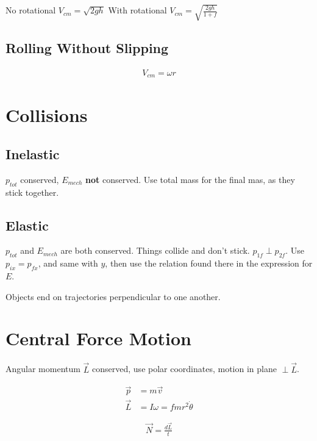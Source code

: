 \documentclass[10pt]{amsart}
\newcommand{\vc}[1]{\overrightarrow{#1}}
\begin{document}
\begin{multicols}{2}
  No rotational $V_{cm}=\sqrt{2gh}$
  With rotational $V_{cm}=\sqrt{\frac{2gh}{1+f}}$

  \subsection{Rolling Without Slipping}%
  \label{sub:rolling_without_slipping}

  \begin{align*}
    V_{cm}=\omega r
  \end{align*}

  \section{Collisions}%
  \label{sec:collisions}

  \subsection{Inelastic}%
  \label{sub:inelastic}

  $p_{tot}$ conserved, $E_{mech}$ \textbf{not} conserved. Use total mass for
  the final mas, as they stick together.

  \subsection{Elastic}%
  \label{sub:elastic}

  $p_{tot}$ and $E_{mech}$ are both conserved. Things collide and don't stick.
  $p_{1f}\perp p_{2f}$. Use $p_{ix}=p_{fx}$, and same with $y$, then use the
  relation found there in the expression for $E$.

  Objects end on trajectories perpendicular to one another.

  \section{Central Force Motion}%
  \label{sec:central_force_motion}

  Angular momentum $\vc{L}$ conserved, use polar coordinates, motion in plane
  $\perp\vc{L}$.

  \begin{align*}
    \vc{p}&=m\vc{v}\\
    \vc{L}&=I\omega=fmr^2\dot{\theta}
  \end{align*}

  \begin{align*}
    \vc{N}=\frac{d\vc{L}}{t}
  \end{align*}


\end{multicols}
\end{document}
